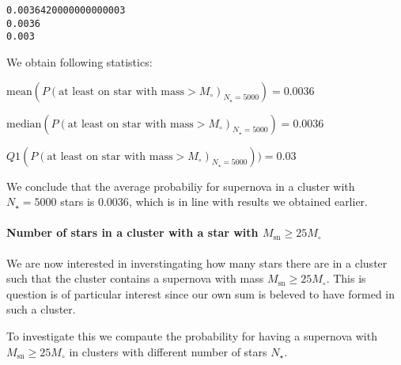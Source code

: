 \documentclass[11pt]{article}
\begin{document}
    \begin{Verbatim}[commandchars=\\\{\}]
0.0036420000000000003
0.0036
0.003

    \end{Verbatim}

    We obtain following statistics:

\(\text{mean}(P(\text{at least on star with mass} > M_{\circ})_{N_{\star}=5000}) = 0.0036\)

\(\text{median}(P(\text{at least on star with mass} > M_{\circ})_{N_{\star}=5000}) = 0.0036\)

\(Q1(P(\text{at least on star with mass} > M_{\circ})_{N_{\star}=5000})) = 0.03\)

    We conclude that the average probabiliy for supernova in a cluster with
\(N_{\star} = 5000\) stars is \(0.0036\), which is in line with results
we obtained earlier.

    \paragraph{\texorpdfstring{Number of stars in a cluster with a star with
\(M_{\text{sn}} \geq 25 M_{\circ}\)}{Number of stars in a cluster with a star with M\_\{\textbackslash{}text\{sn\}\} \textbackslash{}geq 25 M\_\{\textbackslash{}circ\}}}\label{number-of-stars-in-a-cluster-with-a-star-with-m_textsn-geq-25-m_circ}

    We are now interested in inverstingating how many stars there are in a
cluster such that the cluster contains a supernova with mass
\(M_{\text{sn}} \geq 25 M_{\circ}\). This is question is of particular
interest since our own sum is beleved to have formed in such a cluster.

To investigate this we compaute the probability for having a supernova
with \(M_{\text{sn}} \geq 25 M_{\circ}\) in clusters with different
number of stars \(N_{\star}\).
\end{document}
